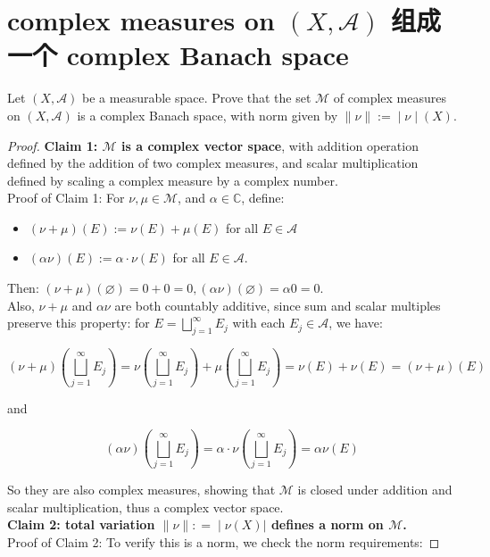 \documentclass{qlnotes-export}
\begin{document}
\section{\texorpdfstring{complex measures on \((X,\mathcal{A})\) 组成一个 complex Banach space}{complex measures on (X,\textbackslash mathcal\{A\}) 组成一个 complex Banach space}}\label{complex-measures-on-xmathcala-ux7ec4ux6210ux4e00ux4e2a-complex-banach-space}

Let \((X,\mathcal{A})\) be a measurable space. Prove that the set \(\mathcal{M}\) of complex measures on \((X,\mathcal{A})\) is a complex Banach space, with norm given by \(\left. \parallel \nu \parallel := \middle| \nu \middle| (X) \right.\).

\begin{proof}

\textbf{Claim 1: \(\mathcal{M}\) is a complex vector space}, with addition operation defined by the addition of two complex measures, and scalar multiplication defined by scaling a complex measure by a complex number.\\
Proof of Claim 1: For \(\nu,\mu \in \mathcal{M}\), and \(\alpha \in {\mathbb{C}}\), define:

\begin{itemize}
\item
  \((\nu + \mu)(E) := \nu(E) + \mu(E)\) for all \(E \in \mathcal{A}\)
\item
  \((\alpha\nu)(E) := \alpha \cdot \nu(E)\) for all \(E \in \mathcal{A}\).
\end{itemize}

Then: \((\nu + \mu)(\varnothing) = 0 + 0 = 0,(\alpha\nu)(\varnothing) = \alpha 0 = 0\).\\
Also, \(\nu + \mu\) and \(\alpha\nu\) are both countably additive, since sum and scalar multiples preserve this property: for \(E = \bigsqcup_{j = 1}^{\infty}E_{j}\) with each \(E_{j} \in \mathcal{A}\), we have:

\[(\nu + \mu)(\bigsqcup\limits_{j = 1}^{\infty}E_{j}) = \nu(\bigsqcup\limits_{j = 1}^{\infty}E_{j}) + \mu(\bigsqcup\limits_{j = 1}^{\infty}E_{j}) = \nu(E) + \nu(E) = (\nu + \mu)(E)\]

and

\[(\alpha\nu)(\bigsqcup\limits_{j = 1}^{\infty}E_{j}) = \alpha \cdot \nu(\bigsqcup\limits_{j = 1}^{\infty}E_{j}) = \alpha\nu(E)\]

So they are also complex measures, showing that \(\mathcal{M}\) is closed under addition and scalar multiplication, thus a complex vector space.\\
\textbf{Claim 2: total variation \(\left. \parallel \nu \parallel : = \middle| \nu(X)| \right.\) defines a norm on \(\mathcal{M}\).}\\
Proof of Claim 2: To verify this is a norm, we check the norm requirements:


\end{proof}
\end{document}
